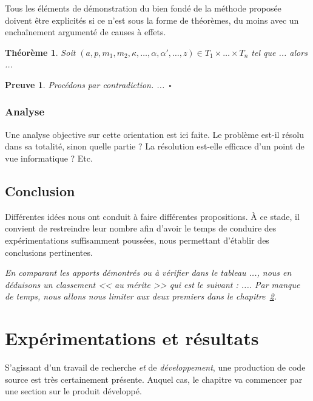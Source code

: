 \documentclass[11pt, french]{report-rd-info}
\newtheorem{theoreme}{Théorème}
\newtheorem{preuve}{Preuve}
\begin{document}
Tous les éléments de démonstration du bien fondé de la méthode proposée doivent être explicités si ce n'est sous la forme de théorèmes, du moins avec un enchaînement argumenté de causes à effets.

\begin{theoreme}
	Soit $(a, p, m_1, m_2, \kappa, \ldots, \alpha, \alpha', \ldots,z) \in T_1 \times \ldots \times T_n$ tel que ... alors ...
\end{theoreme}

\begin{preuve}
	Procédons par contradiction. ...~\hfill$\square$
\end{preuve}

\subsection{Analyse}

Une analyse objective sur cette orientation est ici faite. Le problème est-il résolu dans sa totalité, sinon quelle partie ? La résolution est-elle efficace d'un point de vue informatique ? Etc.

\section{Conclusion}

Différentes idées nous ont conduit à faire différentes propositions. À ce stade, il convient de restreindre leur nombre afin d'avoir le temps de conduire des expérimentations suffisamment poussées, nous permettant d'établir des conclusions pertinentes.

\emph{En comparant les apports démontrés ou à vérifier dans le tableau ..., nous en déduisons un classement << au mérite >> qui est le suivant : .... Par manque de temps, nous allons nous limiter aux deux premiers dans le chapitre~\ref{chap:Experimentations}.}


\chapter{Expérimentations et résultats}
\label{chap:Experimentations}

S'agissant d'un travail de recherche \emph{et} de \emph{développement}, une production de code source est très certainement présente. Auquel cas, le chapitre va commencer par une section sur le produit développé.
\end{document}
